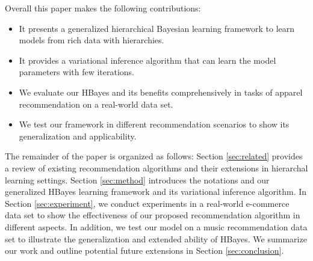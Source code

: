Overall this paper makes the following contributions:

\begin{itemize}
\item It presents a generalized hierarchical Bayesian learning framework to learn models from rich data with hierarchies.
\item It provides a variational inference algorithm that can learn the model parameters with few iterations.
\item We evaluate our HBayes and its benefits comprehensively in tasks of apparel recommendation on a real-world data set. 
\item We test our framework in different recommendation scenarios to show its generalization and applicability.
\end{itemize}

The remainder of the paper is organized as follows: Section \ref{sec:related} provides a review of existing recommendation algorithms and their extensions in hierarchal learning settings. Section \ref{sec:method} introduces the notations and our generalized HBayes learning framework and its variational inference algorithm. In Section \ref{sec:experiment}, we conduct experiments in a real-world e-commerce data set to show the effectiveness of our proposed recommendation algorithm in different aspects. In addition, we test our model on a music recommendation data set to illustrate the generalization and extended ability of HBayes. We summarize our work and outline potential future extensions in Section \ref{sec:conclusion}.

